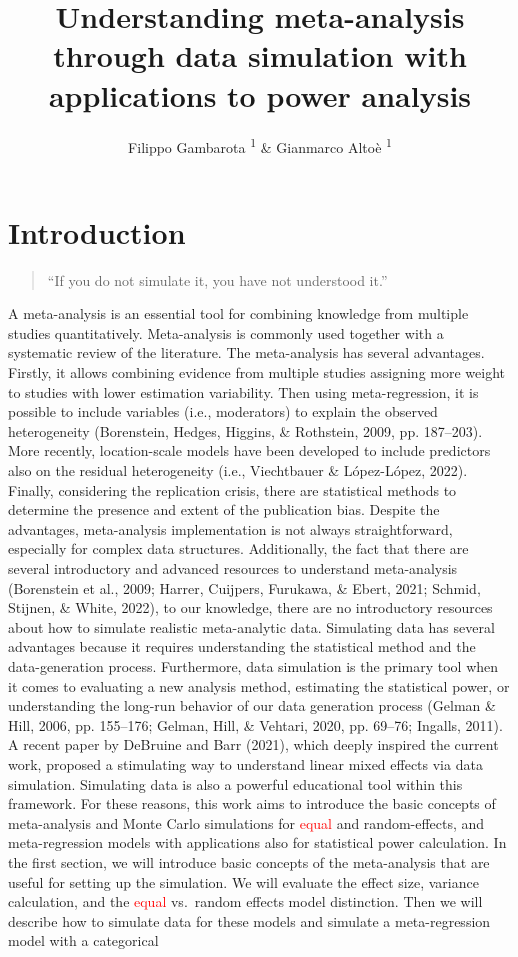 \documentclass[
  man,floatsintext]{apa6}
\title{Understanding meta-analysis through data simulation with applications to power analysis}
\author{Filippo Gambarota \orcidlink{0000-0002-6666-1747}\textsuperscript{1} \& Gianmarco Altoè \orcidlink{0000-0003-1154-9528}\textsuperscript{1}}
\date{}
\affiliation{\vspace{0.5cm}\textsuperscript{1} Department of Developmental and Social Psychology, University of Padova, Italy}
\begin{document}
\maketitle

\hypertarget{introduction}{%
\section{Introduction}\label{introduction}}

\begin{quote}
``If you do not simulate it, you have not understood it.''
\end{quote}

A meta-analysis is an essential tool for combining knowledge from multiple studies quantitatively. Meta-analysis is commonly used together with a systematic review of the literature. The meta-analysis has several advantages. Firstly, it allows combining evidence from multiple studies assigning more weight to studies with lower estimation variability. \color{red} Then using meta-regression, it is possible to include variables (i.e., moderators) to explain the observed heterogeneity (Borenstein, Hedges, Higgins, \& Rothstein, 2009, pp. 187--203). More recently, location-scale models have been developed to include predictors also on the residual heterogeneity (i.e., Viechtbauer \& López-López, 2022). \color{black} Finally, considering the replication crisis, there are statistical methods to determine the presence and extent of the publication bias. Despite the advantages, meta-analysis implementation is not always straightforward, especially for complex data structures. Additionally, the fact that there are several introductory and advanced resources to understand meta-analysis (Borenstein et al., 2009; Harrer, Cuijpers, Furukawa, \& Ebert, 2021; Schmid, Stijnen, \& White, 2022), to our knowledge, there are no introductory resources about how to simulate realistic meta-analytic data. Simulating data has several advantages because it requires understanding the statistical method and the data-generation process. Furthermore, data simulation is the primary tool when it comes to evaluating a new analysis method, estimating the statistical power, or understanding the long-run behavior of our data generation process (Gelman \& Hill, 2006, pp. 155--176; Gelman, Hill, \& Vehtari, 2020, pp. 69--76; Ingalls, 2011). A recent paper by DeBruine and Barr (2021), which deeply inspired the current work, proposed a stimulating way to understand linear mixed effects via data simulation. Simulating data is also a powerful educational tool within this framework. For these reasons, this work aims to introduce the basic concepts of meta-analysis and Monte Carlo simulations for \textcolor{red}{equal} and random-effects, and meta-regression models with applications also for statistical power calculation. In the first section, we will introduce basic concepts of the meta-analysis that are useful for setting up the simulation. We will evaluate the effect size, variance calculation, and the \textcolor{red}{equal} vs.~random effects model distinction. Then we will describe how to simulate data for these models and simulate a meta-regression model with a categorical 
\end{document}
